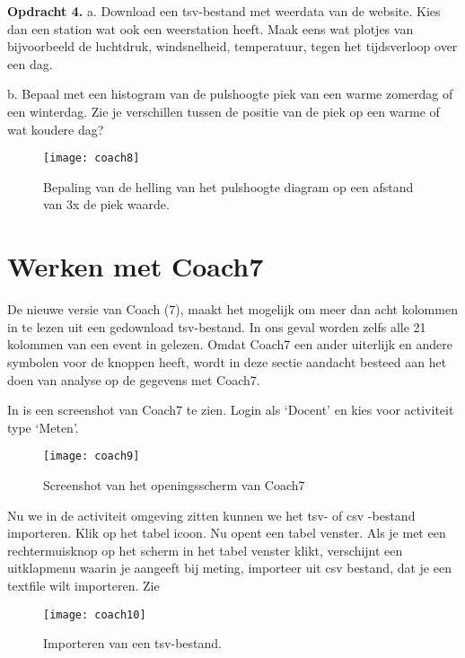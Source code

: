 \textbf{Opdracht 4.}
a.
Download een tsv-bestand met weerdata van de \hisparc website.
Kies dan een \hisparc station wat ook een weerstation heeft.
Maak eens wat plotjes van bijvoorbeeld de luchtdruk, windsnelheid, temperatuur,
tegen het tijdsverloop over een dag.

b. Bepaal met een histogram van de pulshoogte piek van een warme zomerdag of
een winterdag. Zie je verschillen tussen de positie van de piek op een warme of
wat koudere dag?

\begin{figure}
    \centering
    \texttt{[image: coach8]}
    \caption{Bepaling van de helling van het pulshoogte diagram op een afstand
    van 3x de piek waarde.}
    \label{fig:coach8}
\end{figure}

\section{Werken met Coach7}

De nieuwe versie van Coach (7), maakt het mogelijk om meer dan acht kolommen in te lezen
uit een gedownload tsv-bestand. In ons geval worden zelfs alle 21 kolommen van een event in gelezen.
Omdat Coach7 een ander uiterlijk en andere symbolen voor de knoppen heeft, wordt
in deze sectie aandacht besteed aan het doen van analyse op de gegevens met Coach7.

In  is een screenshot van Coach7 te zien.
Login als `Docent' en kies voor activiteit type `Meten'.


\begin{figure}
    \centering
    \texttt{[image: coach9]}
    \caption{Screenshot van het openingsscherm van Coach7}
    \label{fig:coach9}
\end{figure}

Nu we in de activiteit omgeving zitten kunnen we het tsv- of csv -bestand importeren.
Klik op het tabel icoon. Nu opent een tabel venster.
Als je met een rechtermuisknop op het scherm in het tabel venster klikt, verschijnt
een uitklapmenu waarin je aangeeft bij meting, importeer uit csv bestand,
dat je een textfile wilt importeren.
Zie 

\begin{figure}
    \centering
    \texttt{[image: coach10]}
    \caption{Importeren van een tsv-bestand.}
    \label{fig:coach10}
\end{figure}

